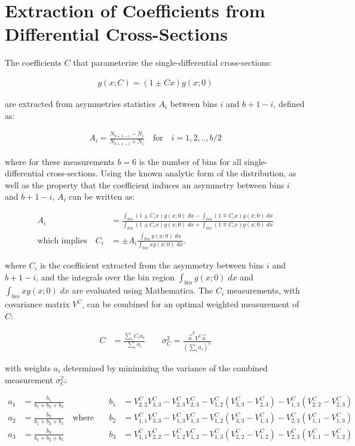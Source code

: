 \section{Extraction of Coefficients from Differential Cross-Sections}
The coefficients $C$ that parameterize the single-differential cross-sections: 
\begin{linenomath*}
\begin{align}
g(x;C) = (1 \pm Cx)g(x;0)
\end{align}
\end{linenomath*}
are extracted from asymmetries statistics $A_i$ between bins $i$ and $b+1-i$, defined as:
\begin{linenomath*}
\begin{align}
A_i = \frac{N_{b+1-i} - N_i}{N_{b+1-i} + N_i} \quad \text{for} \quad i = 1,2,..,b/2
\end{align}
\end{linenomath*}
where for these measurements $b=6$ is the number of bins for all single-differential cross-sections.
Using the known analytic form of the distribution, as well as the property that the coefficient induces an asymmetry between bins $i$ and $b+1-i$, $A_i$ can be written as:
\begin{linenomath*}
\begin{align}
A_i &= \frac{\int_{bin} (1 \pm C_i x)g(x;0) \; dx  - \int_{bin} (1 \mp C_i x)g(x;0) \; dx}{\int_{bin} (1 \pm C_i x)g(x;0) \; dx  + \int_{bin} (1 \mp C_i x)g(x;0) \; dx} \\
\text{which implies} \quad C_i &= \pm A_i  \frac{\int_{bin} g(x;0) \; dx}{\int_{bin} x g(x;0) \; dx}.
\end{align}
\end{linenomath*}
where $C_i$ is the coefficient extracted from the asymmetry between bins $i$ and $b+1-i$, and the integrals over the bin region $\int_{bin} g(x;0) \; dx$ and $\int_{bin} x g(x;0) \; dx$ are evaluated using Mathematica.
The $C_i$ measurements, with covariance matrix $V^C$, can be combined for an optimal weighted measurement of $C$:
\begin{linenomath*}
\begin{align*}
C &= \frac{\sum_i C_i a_i}{\sum_i a_i} \quad \quad \sigma^2_C = \frac{\vec{a}^T V^C \vec{a}}{\left( \sum_i a_i \right)^2}
\end{align*}
\end{linenomath*}
with weights $a_i$ determined by minimizing the variance of the combined measurement $\sigma^2_C$:
\begin{linenomath*}
\begin{align*}
  a_1 &= \frac{b_1}{b_1+b_2+b_3} \quad \quad & b_1 &= V^C_{2,2}V^C_{3,3} - V^C_{2,3}V^C_{2,3} - V^C_{1,2}(V^C_{3,3}-V^C_{2,3}) - V^C_{1,3}(V^C_{2,2}-V^C_{2,3}) \\
  a_2 &= \frac{b_2}{b_1+b_2+b_3} \quad \text{where} \quad & b_2 &= V^C_{1,1}V^C_{3,3} - V^C_{1,3}V^C_{1,3} - V^C_{1,2}(V^C_{3,3}-V^C_{1,3}) - V^C_{2,3}(V^C_{1,1}-V^C_{1,3}) \\
  a_3 &= \frac{b_3}{b_1+b_2+b_3} \quad \quad & b_3 &= V^C_{1,1}V^C_{2,2} - V^C_{1,2}V^C_{1,2} - V^C_{1,3}(V^C_{2,2}-V^C_{1,2}) - V^C_{2,3}(V^C_{1,1}-V^C_{1,2}) \\
\end{align*}
\end{linenomath*}
